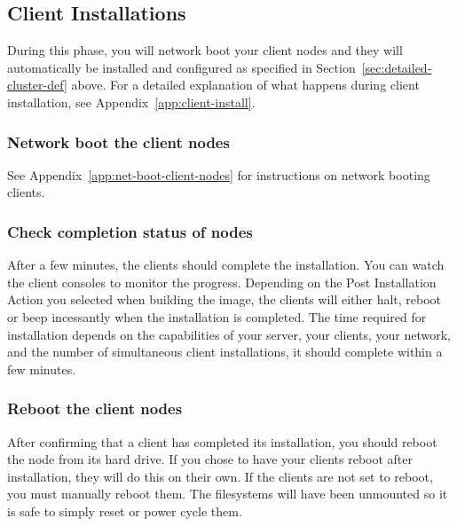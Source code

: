 
\subsection{Client Installations}
\label{det:clientinstall}

During this phase, you will network boot your client nodes and they
will automatically be installed and configured as specified in
Section~\ref{sec:detailed-cluster-def} above. For a detailed
explanation of what happens during client installation, see
Appendix~\ref{app:client-install}.

\subsubsection{Network boot the client nodes}

See Appendix~\ref{app:net-boot-client-nodes} for instructions on
network booting clients.

\subsubsection{Check completion status of nodes}
\label{det:clientfinish}

After a few minutes, the clients should complete the installation.
You can watch the client consoles to monitor the progress. Depending
on the Post Installation Action you selected when building the image,
the clients will either halt, reboot or beep incessantly when the 
installation is completed. 
The time required for installation depends on the capabilities of
your server, your clients, your network, and the number of simultaneous 
client installations, it should complete within a few minutes.
  
\subsubsection{Reboot the client nodes}

After confirming that a client has completed its installation, you
should reboot the node from its hard drive. If you chose to have your
clients reboot after installation, they will do this on their
own. If the clients are not set to reboot, you must manually
reboot them. The filesystems will have been unmounted so it is safe
to simply reset or power cycle them.

